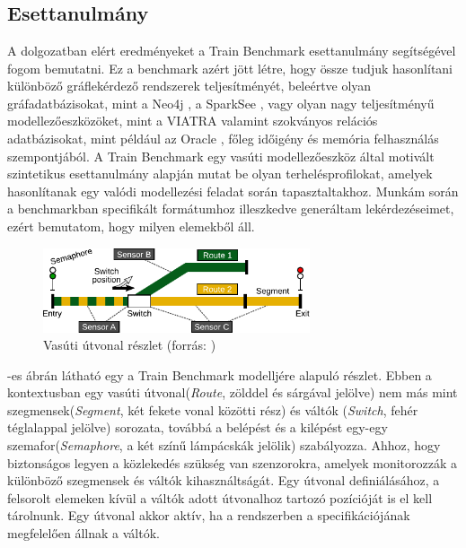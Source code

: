 \chapter{\eloismeretek}
\label{chp:2}

\section{Esettanulmány}
A dolgozatban elért eredményeket a Train Benchmark \cite{szarnyas2018train} esettanulmány segítségével fogom bemutatni. Ez a benchmark azért jött létre, hogy össze tudjuk hasonlítani különböző gráflekérdező rendszerek teljesítményét, beleértve olyan gráfadatbázisokat, mint a Neo4j \cite{neo4j}, a SparkSee \cite{sparksee}, vagy olyan nagy teljesítményű modellezőeszközöket, mint a VIATRA \cite{viatra} valamint szokványos relációs adatbázisokat, mint például az Oracle \cite{oracle}, főleg időigény és memória felhasználás szempontjából. A Train Benchmark egy vasúti modellezőeszköz által motivált szintetikus esettanulmány alapján mutat be olyan terhelésprofilokat, amelyek hasonlítanak egy valódi modellezési feladat során tapasztaltakhoz. Munkám során a benchmarkban specifikált formátumhoz illeszkedve generáltam lekérdezéseimet, ezért bemutatom, hogy milyen elemekből áll. 

\begin{figure}
	\centering
	\includegraphics[width=0.7\textwidth]{figures/trainbenchmarkfig1}
	\caption{Vasúti útvonal részlet (forrás: \cite{szarnyas2018train})}
	\label{fig:trainbenchmark}
\end{figure}

-es ábrán látható egy a Train Benchmark modelljére alapuló részlet.
Ebben a kontextusban egy vasúti útvonal(\textit{Route}, zölddel és sárgával jelölve) nem más mint szegmensek(\textit{Segment}, két fekete vonal közötti rész) és váltók (\textit{Switch}, fehér téglalappal jelölve) sorozata, továbbá a belépést és a kilépést egy-egy szemafor(\textit{Semaphore}, a két színű lámpácskák jelölik) szabályozza. Ahhoz, hogy biztonságos legyen a közlekedés szükség van szenzorokra, amelyek monitorozzák a különböző szegmensek és váltók kihasználtságát. Egy útvonal definiálásához, a felsorolt elemeken kívül a váltók adott útvonalhoz tartozó pozícióját is el kell tárolnunk. Egy útvonal akkor aktív, ha a rendszerben a specifikációjának megfelelően állnak a váltók.




